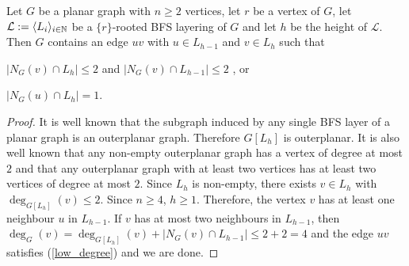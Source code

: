 \documentclass{patmorin}
\begin{document}
\begin{lem}\label{good_edge}
  Let $G$ be a planar graph with $n\ge 2$ vertices, let $r$ be a vertex of $G$, let $\mathcal{L}:=\langle L_i\rangle_{i\in\mathbb{N}}$ be a $\{r\}$-rooted BFS layering of $G$ and let $h$ be the height of $\mathcal{L}$.
  Then $G$ contains an edge $uv$ with $u\in L_{h-1}$ and $v\in L_{h}$ such that
  \begin{compactenum}[(a)]
    \item $|N_G(v)\cap L_h|\le 2$ and $|N_G(v)\cap L_{h-1}|\le 2$ , or\label{low_degree}
    \item $|N_G(u)\cap L_h|=1$.\label{only_child}
  \end{compactenum}
\end{lem}

\begin{proof}
  It is well known that the subgraph induced by any single BFS layer of a planar graph is an outerplanar graph.  Therefore $G[L_h]$ is outerplanar.  It is also well known that any non-empty outerplanar graph has a vertex of degree at most $2$ and that any outerplanar graph with at least two vertices has at least two vertices of degree at most $2$.  Since $L_h$ is non-empty, there exists $v\in L_h$ with  $\deg_{G[L_h]}(v)\le 2$.  Since $n\ge 4$, $h\ge 1$.  Therefore, the vertex $v$ has at least one neighbour $u$ in $L_{h-1}$.  If $v$ has at most two neighbours in $L_{h-1}$, then $\deg_G(v)=\deg_{G[L_h]}(v)+|N_G(v)\cap L_{h-1}|\le 2+2=4$ and the edge $uv$ satisfies (\ref{low_degree}) and we are done.


\end{proof}
\end{document}
